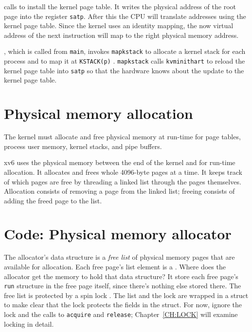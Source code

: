 calls
to install the kernel page table.
It writes the physical address of the root page
into the register
\texttt{satp}.
After this the CPU will translate addresses using the kernel
page table.  Since the kernel uses an identity mapping, the now
virtual address of the next instruction will map to the right physical
memory address.

 , which is
called from \lstinline{main}, invokes \lstinline{mapkstack}
 to allocate a kernel stack for each
process and to map it at \lstinline{KSTACK(p)}
.  \lstinline{mapkstack} calls
\lstinline{kvminithart} to reload the kernel page table into
\texttt{satp} so that the hardware knows about the update to the
kernel page table.

\section{Physical memory allocation}

The kernel must allocate and free physical memory at run-time for
page tables,
process user memory,
kernel stacks,
and pipe buffers.

xv6 uses the physical memory between the end of the kernel and
for run-time allocation. It allocates and frees whole 4096-byte pages
at a time. It keeps track of which pages are free by threading a
linked list through the pages themselves. Allocation consists of
removing a page from the linked list; freeing consists of adding the
freed page to the list.
\section{Code: Physical memory allocator}

The allocator's data structure is a
\textit{free list}
of physical memory pages that are available
for allocation.
Each free page's list element is a
.
Where does the allocator get the memory
to hold that data structure?
It store each free page's
\lstinline{run}
structure in the free page itself,
since there's nothing else stored there.
The free list is
protected by a spin lock
.
The list and the lock are wrapped in a struct
to make clear that the lock protects the fields
in the struct.
For now, ignore the lock and the calls to
\lstinline{acquire}
and
\lstinline{release};
Chapter~\ref{CH:LOCK} will examine
locking in detail.

